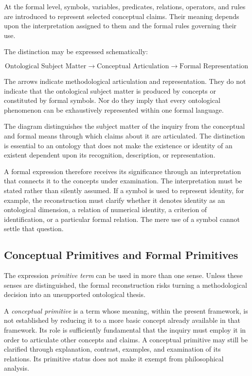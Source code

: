 At the formal level, symbols, variables, predicates, relations,
operators, and rules are introduced to represent selected
conceptual claims. Their meaning depends upon the
interpretation assigned to them and the formal rules
governing their use.

The distinction may be expressed schematically:

\[
\text{Ontological Subject Matter}
\longrightarrow
\text{Conceptual Articulation}
\longrightarrow
\text{Formal Representation}
\]

The arrows indicate methodological articulation and
representation. They do not indicate that the ontological
subject matter is produced by concepts or constituted by
formal symbols. Nor do they imply that every ontological
phenomenon can be exhaustively represented within one
formal language.



The diagram distinguishes the subject matter of the inquiry
from the conceptual and formal means through which claims
about it are articulated. The distinction is essential to
an ontology that does not make the existence or identity
of an existent dependent upon its recognition, description,
or representation.

A formal expression therefore receives its significance
through an interpretation that connects it to the concepts
under examination. The interpretation must be stated
rather than silently assumed. If a symbol is used to
represent identity, for example, the reconstruction must
clarify whether it denotes identity as an ontological
dimension, a relation of numerical identity, a criterion
of identification, or a particular formal relation.
The mere use of a symbol cannot settle that question.

\subsection{Conceptual Primitives and Formal Primitives}

The expression \emph{primitive term} can be used in more
than one sense. Unless these senses are distinguished,
the formal reconstruction risks turning a methodological
decision into an unsupported ontological thesis.

A \emph{conceptual primitive} is a term whose meaning,
within the present framework, is not established by
reducing it to a more basic concept already available
in that framework. Its role is sufficiently fundamental
that the inquiry must employ it in order to articulate
other concepts and claims. A conceptual primitive may
still be clarified through explanation, contrast,
examples, and examination of its relations. Its
primitive status does not make it exempt from philosophical
analysis.

